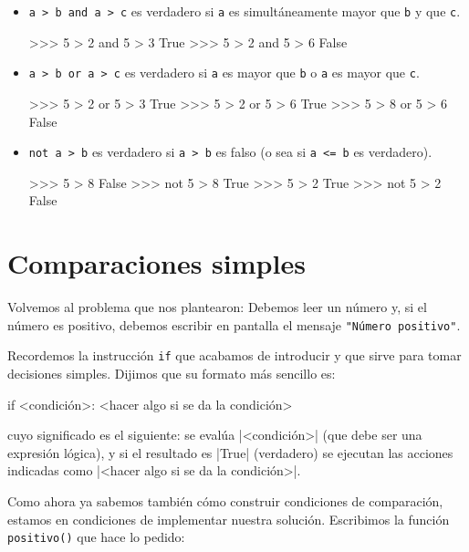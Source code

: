 \begin{itemize}
\item \lstinline!a > b and a > c! es verdadero si \lstinline!a! es
simultáneamente mayor que \lstinline!b! y que \lstinline!c!.

\begin{codigo-python-sn}
>>> 5 > 2 and 5 > 3
True
>>> 5 > 2 and 5 > 6
False
\end{codigo-python-sn}

\item \lstinline!a > b or a > c! es verdadero si \lstinline!a! es mayor que
\lstinline!b! o \lstinline!a! es mayor que \lstinline!c!.

\begin{codigo-python-sn}
>>> 5 > 2 or 5 > 3
True
>>> 5 > 2 or 5 > 6
True
>>> 5 > 8 or 5 > 6
False
\end{codigo-python-sn}

\item \lstinline!not a > b! es verdadero si \lstinline!a > b! es falso (o
sea si \lstinline!a <= b! es verdadero).

\begin{codigo-python-sn}
>>> 5 > 8
False
>>> not 5 > 8
True
>>> 5 > 2
True
>>> not 5 > 2
False
\end{codigo-python-sn}

\end{itemize}

\section{Comparaciones simples}

Volvemos al problema que nos plantearon: Debemos leer un número y, si el
número es positivo, debemos escribir en pantalla el mensaje
 \lstinline!"Número positivo"!.

Recordemos la instrucción \lstinline!if! que acabamos de introducir y que sirve
para tomar decisiones simples. Dijimos que su formato más sencillo es:

\begin{codigo-python-sn}
if <condición>:
    <hacer algo si se da la condición>
\end{codigo-python-sn}

cuyo significado es el siguiente:
se evalúa |<condición>| (que debe ser una expresión lógica), y si el resultado
es |True| (verdadero) se ejecutan las acciones indicadas como
|<hacer algo si se da la condición>|.

Como ahora ya sabemos también cómo construir condiciones de comparación,
estamos en condiciones de implementar nuestra solución. Escribimos la
función \lstinline+positivo()+ que hace lo pedido:

